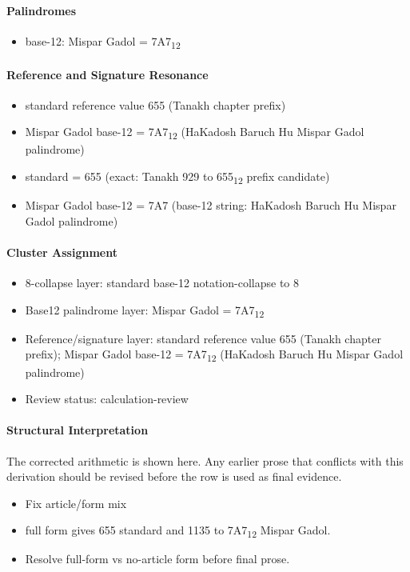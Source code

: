 \paragraph{Palindromes}
\begin{itemize}
\item base-12: Mispar Gadol = 7A7\textsubscript{12}
\end{itemize}
\paragraph{Reference and Signature Resonance}
\begin{itemize}
\item standard reference value 655 (Tanakh chapter prefix)
\item Mispar Gadol base-12 = 7A7\textsubscript{12} (HaKadosh Baruch Hu Mispar Gadol palindrome)
\item standard = 655 (exact: Tanakh 929 to 655\textsubscript{12} prefix candidate)
\item Mispar Gadol base-12 = 7A7 (base-12 string: HaKadosh Baruch Hu Mispar Gadol palindrome)
\end{itemize}
\paragraph{Cluster Assignment}
\begin{itemize}
\item 8-collapse layer: standard base-12 notation-collapse to 8
\item Base12 palindrome layer: Mispar Gadol = 7A7\textsubscript{12}
\item Reference/signature layer: standard reference value 655 (Tanakh chapter prefix); Mispar Gadol base-12 = 7A7\textsubscript{12} (HaKadosh Baruch Hu Mispar Gadol palindrome)
\item Review status: calculation-review
\end{itemize}
\paragraph{Structural Interpretation}
The corrected arithmetic is shown here. Any earlier prose that conflicts with this derivation should be revised before the row is used as final evidence.

\begin{itemize}
\item Fix article/form mix
\item full form gives 655 standard and 1135 to 7A7\textsubscript{12} Mispar Gadol.
\item Resolve full-form vs no-article form before final prose.
\end{itemize}

